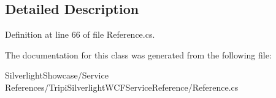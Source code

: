 \subsection{Detailed Description}


Definition at line 66 of file Reference.cs.

The documentation for this class was generated from the following file:\begin{DoxyCompactItemize}
\item 
SilverlightShowcase/Service References/TripiSilverlightWCFServiceReference/Reference.cs\end{DoxyCompactItemize}
